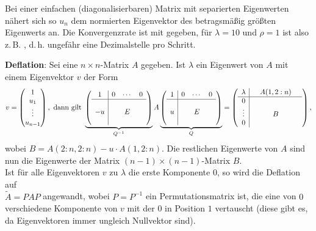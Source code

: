 Bei einer einfachen (diagonalisierbaren) Matrix mit separierten Eigenwerten
nähert sich so $u_n$ dem normierten Eigenvektor des betragsmäßig größten
Eigenwerts an.
Die Konvergenzrate ist mit
 gegeben,
für $\lambda = 10$ und $\rho = 1$ ist also z.\,B.
, d.\,h.
ungefähr eine Dezimalstelle pro Schritt.

\linie
\pagebreak

\textbf{Deflation}:
Sei eine $n \times n$-Matrix $A$ gegeben.
Ist $\lambda$ ein Eigenwert von $A$ mit einem Eigenvektor $v$ der Form
\begin{align*}
    v = \begin{pmatrix}1 \\ u_1 \\ \vdots \\ u_{n-1}\end{pmatrix},
    \text{ dann gilt }
    \underbrace{\left(\begin{array}{c|ccc}
    1 & 0 & \cdots & 0 \\ \hline & & & \\ -u & & E & \\ & & &
    \end{array}\right)}_{Q^{-1}} A
    \underbrace{\left(\begin{array}{c|ccc}
    1 & 0 & \cdots & 0 \\ \hline & & & \\ u & & E & \\ & & &
    \end{array}\right)}_{Q}
    = \left(\begin{array}{c|ccc}
    \lambda & & A(1, 2:n) & \\ \hline 0 & & & \\
    \vdots & & B & \\ 0 & & &
    \end{array}\right),
\end{align*}
wobei $B = A(2:n, 2:n) - u \cdot A(1, 2:n)$.
Die restlichen Eigenwerte von $A$ sind nun die Eigenwerte der Matrix
$(n - 1) \times (n - 1)$-Matrix $B$. \\
Ist für alle Eigenvektoren $v$ zu $\lambda$ die erste Komponente $0$, so
wird die Deflation auf \\
$\widetilde{A} = PAP$ angewandt, wobei
$P = P^{-1}$ ein Permutationsmatrix ist, die eine von $0$ verschiedene
Komponente von $v$ mit der $0$ in Position $1$ vertauscht
(diese gibt es, da Eigenvektoren immer ungleich Nullvektor sind).

